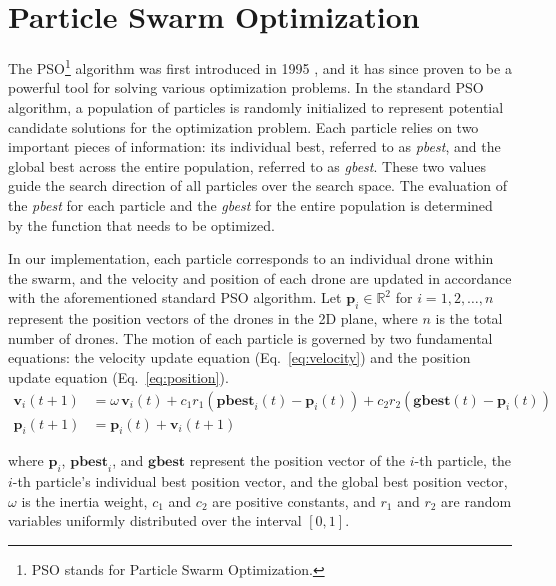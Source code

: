 \section{Particle Swarm Optimization}
The PSO\footnote{PSO stands for Particle Swarm Optimization.} algorithm was first introduced in 1995 
\cite{PSO_original}, and it has since proven to be a powerful tool for solving various optimization problems. 
In the standard PSO algorithm, a population of particles is randomly initialized to represent potential candidate 
solutions for the optimization problem. Each particle relies on two important pieces of information: its individual 
best, referred to as \textit{pbest}, and the global best across the entire population, referred to as \textit{gbest}. 
These two values guide the search direction of all particles over the search space. The evaluation of the 
\textit{pbest} for each particle and the \textit{gbest} for the entire population is determined by the function 
that needs to be optimized.

\par In our implementation, each particle corresponds to an individual drone 
within the swarm, and the velocity and position of each drone are updated in 
accordance with the aforementioned standard PSO algorithm. Let $\mathbf{p}_i \in \mathbb{R}^2$ 
for $i = 1, 2, \dots, n$ represent the position vectors of the drones in the 2D plane, 
where $n$ is the total number of drones. The motion of each particle is governed 
by two fundamental equations: the velocity update equation (Eq.~\ref{eq:velocity}) and 
the position update equation (Eq.~\ref{eq:position}).
\begin{align}
    \mathbf{v}_{i}(t+1) &= \omega \, \mathbf{v}_{i}(t) + c_1 r_1 \left( \mathbf{pbest}_{i}(t) - \mathbf{p}_{i}(t) \right) 
    + c_2 r_2 \left( \mathbf{gbest}(t) - \mathbf{p}_{i}(t) \right) \label{eq:velocity} \\
    \mathbf{p}_{i}(t+1) &= \mathbf{p}_{i}(t) + \mathbf{v}_{i}(t+1) \label{eq:position}
\end{align}
    
where $\mathbf{p}_i$, $\mathbf{pbest}_i$, and $\mathbf{gbest}$ represent the position vector of the $i$-th particle, 
the $i$-th particle's individual best position vector, and the global best position vector, 
$\omega$ is the inertia weight, $c_1$ and $c_2$ are positive constants, and
$r_1$ and $r_2$ are random variables uniformly distributed over the interval $[0, 1]$.

